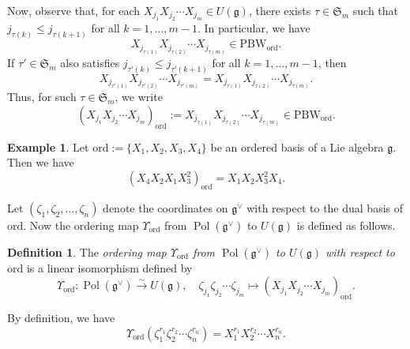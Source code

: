 \documentclass[a4paper,11pt,reqno]{amsart}
\newcommand{\frakg}{\mathfrak{g}}
\newcommand{\0}{{\bf 0}}
\newcommand{\1}{{\bf 1}}
\DeclareMathOperator{\Pol}{Pol}
\newcommand{\ord}{{\mathrm{ord}}}
\DeclareMathOperator{\To}{\longrightarrow}
\theoremstyle{plain}
\theoremstyle{definition}
\newtheorem{definition}[equation]{Definition}
\newtheorem{example}[equation]{Example}
\numberwithin{equation}{section}
\theoremstyle{definition}
\begin{document}
Now, observe that, for each  $X_{j_1}X_{j_2}\cdots X_{j_m} \in U(\frakg)$,
there exists $\tau \in \mathfrak{S}_m$ such that 
$j_{\tau(k)} \leq j_{\tau(k+1)}$ for all $k=1,\ldots, m-1$.
In particular, we have 
\begin{equation*}
X_{j_{\tau(1)}}X_{j_{\tau(2)}} \cdots X_{j_{\tau(m)}} \in \mathrm{PBW}_\ord.
\end{equation*}
If $\tau' \in \mathfrak{S}_{m}$ also satisfies
$j_{\tau'(k)} \leq j_{\tau'(k+1)}$ for all $k=1,\ldots, m-1$,
then 
\begin{equation*}
X_{j_{\tau'(1)}}X_{j_{\tau'(2)}} \cdots X_{j_{\tau'(m)}}=
X_{j_{\tau(1)}}X_{j_{\tau(2)}} \cdots X_{j_{\tau(m)}}.
\end{equation*}
Thus, for such $\tau \in \mathfrak{S}_m$, we write
\begin{equation}\label{eqn:X-ord}
(X_{j_1}X_{j_2}\cdots X_{j_m})_\ord
:=X_{j_{\tau(1)}}X_{j_{\tau(2)}} \cdots X_{j_{\tau(m)}} \in \mathrm{PBW}_\ord.
\end{equation}

\begin{example}\label{example:arrangement1}
Let $\ord:=\{X_1,X_2, X_3,X_4\}$ be an ordered basis
of a Lie algebra $\frakg$. Then
we have 
\begin{equation*}
(X_4X_2X_1X_3^2)_\ord=X_1X_2X_3^2X_4.    
\end{equation*}
\end{example}

Let $(\zeta_1,\zeta_2,\ldots, \zeta_n)$ denote 
the coordinates on $\frakg^\vee$ with respect to 
the dual basis of $\ord$. 
Now the ordering map $\Upsilon_{\ord}$ from $\Pol(\frakg^\vee)$ to $U(\frakg)$
is defined as follows.

\begin{definition}
The \emph{ordering map $\Upsilon_{\ord}$ from 
$\Pol(\frakg^\vee)$ to $U(\frakg)$ 
with respect to $\ord$} is a linear isomorphism defined by
\begin{equation}\label{eqn:Upsilon_ord}
\Upsilon_{\ord} \colon \Pol(\frakg^\vee) \stackrel{\sim}{\To} U(\frakg), \quad 
\zeta_{j_1}\zeta_{j_2}\cdots \zeta_{j_m} 
\longmapsto
(X_{j_1}X_{j_2}\cdots X_{j_m})_\ord.
\end{equation}
\end{definition}

By definition, we have
\begin{equation}\label{eqn:Uu}
\Upsilon_{\ord} 
(\zeta_1^{r_1} \zeta_2^{r_2}\cdots\zeta_n^{r_n}) 
= X_1^{r_1}X_2^{r_2}\cdots X_n^{r_n}.
\end{equation}
\end{document}
